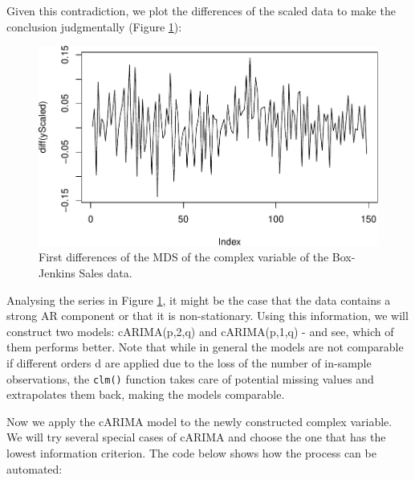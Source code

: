 \documentclass[
]{book}
\begin{document}
Given this contradiction, we plot the differences of the scaled data to make the conclusion judgmentally (Figure \ref{fig:BJSalesComplexDiffs}):

\begin{figure}
\centering
\includegraphics{Svetunkov---Svetunkov---Complex-Valued-Econometrics_files/figure-latex/BJSalesComplexDiffs-1.pdf}
\caption{\label{fig:BJSalesComplexDiffs}First differences of the MDS of the complex variable of the Box-Jenkins Sales data.}
\end{figure}

Analysing the series in Figure \ref{fig:BJSalesComplexDiffs}, it might be the case that the data contains a strong AR component or that it is non-stationary. Using this information, we will construct two models: cARIMA(p,2,q) and cARIMA(p,1,q) - and see, which of them performs better. Note that while in general the models are not comparable if different orders d are applied due to the loss of the number of in-sample observations, the \texttt{clm()} function takes care of potential missing values and extrapolates them back, making the models comparable.

Now we apply the cARIMA model to the newly constructed complex variable. We will try several special cases of cARIMA and choose the one that has the lowest information criterion. The code below shows how the process can be automated:
\end{document}
